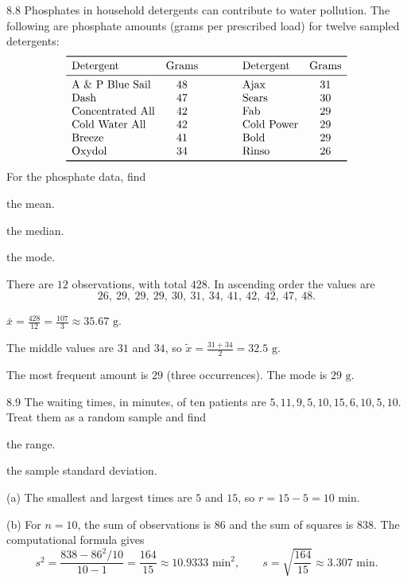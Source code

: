 \documentclass[11pt,oneside]{article}
\begin{document}
\begin{exercise}{8.8}
Phosphates in household detergents can contribute to water pollution. The following are phosphate amounts (grams per prescribed load) for twelve sampled detergents:
\[
\begin{array}{lc@{\qquad\qquad}lc}
\toprule
\text{Detergent}&\text{Grams}&\text{Detergent}&\text{Grams}\\
\midrule
\text{A \& P Blue Sail}&48&\text{Ajax}&31\\
\text{Dash}&47&\text{Sears}&30\\
\text{Concentrated All}&42&\text{Fab}&29\\
\text{Cold Water All}&42&\text{Cold Power}&29\\
\text{Breeze}&41&\text{Bold}&29\\
\text{Oxydol}&34&\text{Rinso}&26\\
\bottomrule
\end{array}
\]
For the phosphate data, find
\begin{exercisesubparts}
\item the mean.
\item the median.
\item the mode.
\end{exercisesubparts}
\end{exercise}
\begin{solution}
There are $12$ observations, with total $428$. In ascending order the values are
\[
26, \ 29, \ 29, \ 29, \ 30, \ 31, \ 34, \ 41, \ 42, \ 42, \ 47, \ 48.
\]
\begin{exercisesubparts}
\item $\displaystyle\bar x=\frac{428}{12}=\boxed{\frac{107}{3}\approx35.67\text{ g}}$.
\item The middle values are $31$ and $34$, so $\displaystyle\tilde x=\frac{31+34}{2}=\boxed{32.5\text{ g}}$.
\item The most frequent amount is $29$ (three occurrences). The mode is $\boxed{29\text{ g}}$.
\end{exercisesubparts}
\end{solution}

\begin{exercise}{8.9}
The waiting times, in minutes, of ten patients are $5, 11, 9, 5, 10, 15, 6, 10, 5, 10$. Treat them as a random sample and find
\begin{exercisesubparts}
\item the range.
\item the sample standard deviation.
\end{exercisesubparts}
\end{exercise}
\begin{solution}
\noindent\textup{(a)} The smallest and largest times are $5$ and $15$, so $\boxed{r=15-5=10\text{ min}}$.

\noindent\textup{(b)} For $n=10$, the sum of observations is $86$ and the sum of squares is $838$. The computational formula gives
\[
s^2=\frac{838-86^2/10}{10-1}=\frac{164}{15}\approx10.9333\text{ min}^2,
\qquad \boxed{s=\sqrt{\frac{164}{15}}\approx3.307\text{ min}}.
\]
\end{solution}
\end{document}
